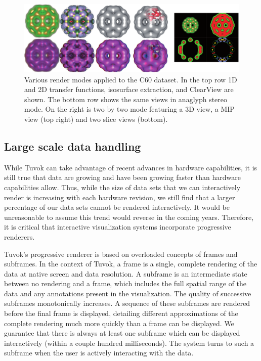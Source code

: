 \begin{figure}
	\includegraphics[width=\linewidth]{images/arch/c60modes}

  \caption{Various render modes applied to the C60 dataset.  In the
  top row 1D and 2D transfer functions, isosurface extraction, and
  ClearView are shown.  The bottom row shows the same views in anaglyph
  stereo mode.  On the right is two by two mode featuring a 3D view, a
  MIP view (top right) and two slice views (bottom).}
	\label{figtvk:modes}

\end{figure}

\subsection{Large scale data handling}
\label{sec:tvk-data}

While Tuvok can take advantage of recent advances in hardware
capabilities, it is still true that data are growing and have been
growing faster than hardware capabilities allow. Thus, while the size
of data sets that we can interactively render is increasing with each
hardware revision, we still find that a larger percentage of our data
sets cannot be rendered interactively.  It would be unreasonable to
assume this trend would reverse in the coming years. Therefore, it is
critical that interactive visualization systems incorporate progressive
renderers.

Tuvok's progressive renderer is based on overloaded
concepts of frames and subframes. In the context of Tuvok, a
frame is a single, complete rendering of the data at native
screen and data resolution. A subframe is an intermediate
state between no rendering and a frame, which includes the
full spatial range of the data and any annotations present in
the visualization. The quality of successive subframes
monotonically increases. A sequence of these subframes are
rendered before the final frame is displayed, detailing different
approximations of the complete rendering much more
quickly than a frame can be displayed. We guarantee that
there is always at least one subframe which can be displayed
interactively (within a couple hundred milliseconds). The
system turns to such a subframe when the user is actively
interacting with the data.

